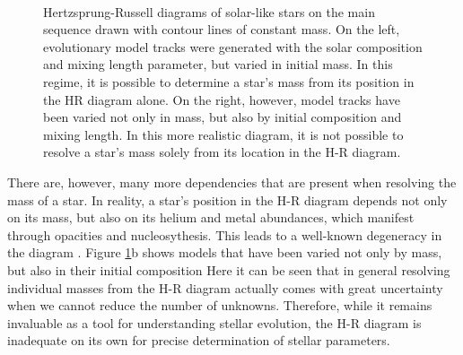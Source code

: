 \documentclass[a4paper,fleqn,usenatbib,useAMS]{mnras}
\begin{document}
\begin{figure}
\centering

\\%
\caption{Hertzsprung-Russell diagrams of solar-like stars on the main sequence drawn with contour lines of constant mass. On the left, evolutionary model tracks were generated with the solar composition and mixing length parameter, but varied in initial mass. In this regime, it is possible to determine a star's mass from its position in the HR diagram alone. On the right, however, model tracks have been varied not only in mass, but also by initial composition and mixing length. In this more realistic diagram, it is not possible to resolve a star's mass solely from its location in the H-R diagram. } 
\label{fig:HR}
\end{figure}

There are, however, many more dependencies that are present when resolving the mass of a star. In reality, a star's position in the H-R diagram depends not only on its mass, but also on its helium and metal abundances, which manifest through opacities and nucleosythesis. This leads to a well-known degeneracy in the diagram \citep[see e.g.][]{2005A&A...436..127J}. Figure \ref{fig:HR}b shows models that have been varied not only by mass, but also in their initial composition  Here it can be seen that in general resolving individual masses from the H-R diagram actually comes with great uncertainty when we cannot reduce the number of unknowns. Therefore, while it remains invaluable as a tool for understanding stellar evolution, the H-R diagram is inadequate on its own for precise determination of stellar parameters. 
\end{document}
